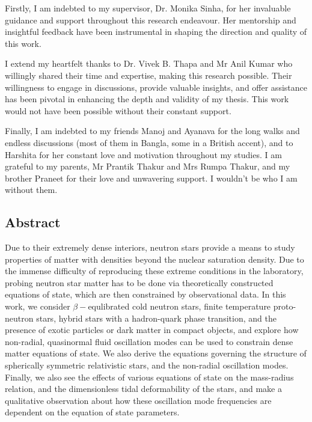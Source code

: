 \documentclass[a4paper,12pt,onehalfspacing]{report}
\newcommand\emptypage{
    \newpage
    \null
    \thispagestyle{empty}
    }
\newcommand{\supname}{Dr. Monika Sinha}
\begin{document}
Firstly, I am indebted to my supervisor, \supname{}, for her invaluable guidance and support throughout this research endeavour. Her mentorship and insightful feedback have been instrumental in shaping the direction and quality of this work. 

I extend my heartfelt thanks to Dr. Vivek B. Thapa and Mr Anil Kumar who willingly shared their time and expertise, making this research possible. Their willingness to engage in discussions, provide valuable insights, and offer assistance has been pivotal in enhancing the depth and validity of my thesis. This work would not have been possible without their constant support.

Finally, I am indebted to my friends Manoj and Ayanava for the long walks and endless discussions (most of them in Bangla, some in a British accent), and to Harshita for her constant love and motivation throughout my studies. I am grateful to my parents, Mr Prantik Thakur and Mrs Rumpa Thakur, and my brother Praneet for their love and unwavering support. I wouldn't be who I am without them.

\emptypage
\begin{flushright}
    \huge{\chapter*{Abstract}}
\end{flushright}
Due to their extremely dense interiors, neutron stars provide a means to study properties of matter with densities beyond the nuclear saturation density. Due to the immense difficulty of reproducing these extreme conditions in the laboratory, probing neutron star matter has to be done via theoretically constructed equations of state, which are then constrained by observational data. In this work, we consider $\beta-$equlibrated cold neutron stars, finite temperature proto-neutron stars, hybrid stars with a hadron-quark phase transition, and the presence of exotic particles or dark matter in compact objects, and explore how non-radial, quasinormal fluid oscillation modes can be used to constrain dense matter equations of state. We also derive the equations governing the structure of spherically symmetric relativistic stars, and the non-radial oscillation modes. Finally, we also see the effects of various equations of state on the mass-radius relation, and the dimensionless tidal deformability of the stars, and make a qualitative observation about how these oscillation mode frequencies are dependent on the equation of state parameters.
\end{document}
